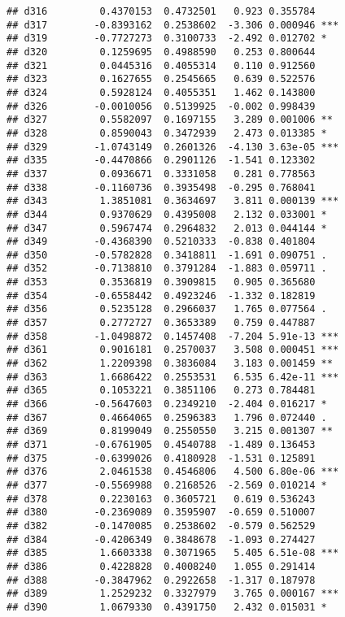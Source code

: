 \documentclass[
]{article}
\begin{document}
\begin{verbatim}
## d316         0.4370153  0.4732501   0.923 0.355784    
## d317        -0.8393162  0.2538602  -3.306 0.000946 ***
## d319        -0.7727273  0.3100733  -2.492 0.012702 *  
## d320         0.1259695  0.4988590   0.253 0.800644    
## d321         0.0445316  0.4055314   0.110 0.912560    
## d323         0.1627655  0.2545665   0.639 0.522576    
## d324         0.5928124  0.4055351   1.462 0.143800    
## d326        -0.0010056  0.5139925  -0.002 0.998439    
## d327         0.5582097  0.1697155   3.289 0.001006 ** 
## d328         0.8590043  0.3472939   2.473 0.013385 *  
## d329        -1.0743149  0.2601326  -4.130 3.63e-05 ***
## d335        -0.4470866  0.2901126  -1.541 0.123302    
## d337         0.0936671  0.3331058   0.281 0.778563    
## d338        -0.1160736  0.3935498  -0.295 0.768041    
## d343         1.3851081  0.3634697   3.811 0.000139 ***
## d344         0.9370629  0.4395008   2.132 0.033001 *  
## d347         0.5967474  0.2964832   2.013 0.044144 *  
## d349        -0.4368390  0.5210333  -0.838 0.401804    
## d350        -0.5782828  0.3418811  -1.691 0.090751 .  
## d352        -0.7138810  0.3791284  -1.883 0.059711 .  
## d353         0.3536819  0.3909815   0.905 0.365680    
## d354        -0.6558442  0.4923246  -1.332 0.182819    
## d356         0.5235128  0.2966037   1.765 0.077564 .  
## d357         0.2772727  0.3653389   0.759 0.447887    
## d358        -1.0498872  0.1457408  -7.204 5.91e-13 ***
## d361         0.9016181  0.2570037   3.508 0.000451 ***
## d362         1.2209398  0.3836084   3.183 0.001459 ** 
## d363         1.6686422  0.2553531   6.535 6.42e-11 ***
## d365         0.1053221  0.3851106   0.273 0.784481    
## d366        -0.5647603  0.2349210  -2.404 0.016217 *  
## d367         0.4664065  0.2596383   1.796 0.072440 .  
## d369         0.8199049  0.2550550   3.215 0.001307 ** 
## d371        -0.6761905  0.4540788  -1.489 0.136453    
## d375        -0.6399026  0.4180928  -1.531 0.125891    
## d376         2.0461538  0.4546806   4.500 6.80e-06 ***
## d377        -0.5569988  0.2168526  -2.569 0.010214 *  
## d378         0.2230163  0.3605721   0.619 0.536243    
## d380        -0.2369089  0.3595907  -0.659 0.510007    
## d382        -0.1470085  0.2538602  -0.579 0.562529    
## d384        -0.4206349  0.3848678  -1.093 0.274427    
## d385         1.6603338  0.3071965   5.405 6.51e-08 ***
## d386         0.4228828  0.4008240   1.055 0.291414    
## d388        -0.3847962  0.2922658  -1.317 0.187978    
## d389         1.2529232  0.3327979   3.765 0.000167 ***
## d390         1.0679330  0.4391750   2.432 0.015031 *  

\end{verbatim}
\end{document}
